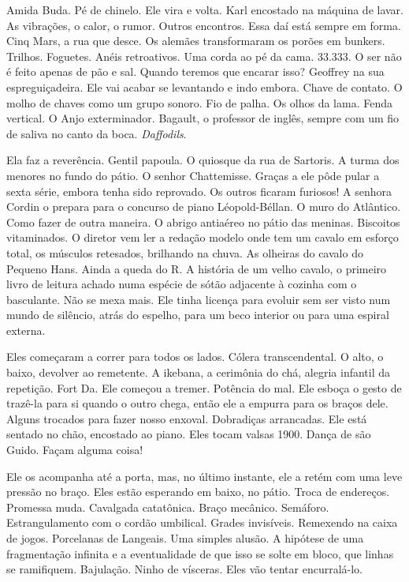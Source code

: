 Amida Buda. Pé de chinelo. Ele vira e volta. Karl encostado na máquina
de lavar. As vibrações, o calor, o rumor. Outros encontros. Essa daí
está sempre em forma. Cinq Mars, a rua que desce. Os alemães
transformaram os porões em bunkers. Trilhos. Foguetes. Anéis
retroativos. Uma corda ao pé da cama. 33.333. O ser não é feito apenas
de pão e sal. Quando teremos que encarar isso? Geoffrey na sua
espreguiçadeira. Ele vai acabar se levantando e indo embora. Chave de
contato. O molho de chaves como um grupo sonoro. Fio de palha. Os olhos
da lama. Fenda vertical. O Anjo exterminador. Bagault, o professor de
inglês, sempre com um fio de saliva no canto da boca. \emph{Daffodils}.

Ela faz a reverência. Gentil papoula. O quiosque da rua de Sartoris. A
turma dos menores no fundo do pátio. O senhor Chattemisse. Graças a ele
pôde pular a sexta série, embora tenha sido reprovado. Os outros ficaram
furiosos! A senhora Cordin o prepara para o concurso de piano
Léopold-Béllan. O muro do Atlântico. Como fazer de outra maneira. O
abrigo antiaéreo no pátio das meninas. Biscoitos vitaminados. O diretor
vem ler a redação modelo onde tem um cavalo em esforço total, os
músculos retesados, brilhando na chuva. As olheiras do cavalo do Pequeno
Hans. Ainda a queda do R. A história de um velho cavalo, o primeiro
livro de leitura achado numa espécie de sótão adjacente à cozinha com o
basculante. Não se mexa mais. Ele tinha licença para evoluir sem ser
visto num mundo de silêncio, atrás do espelho, para um beco interior ou
para uma espiral externa.

Eles começaram a correr para todos os lados. Cólera transcendental. O
alto, o baixo, devolver ao remetente. A ikebana, a cerimônia do chá,
alegria infantil da repetição. Fort Da. Ele começou a tremer. Potência
do mal. Ele esboça o gesto de trazê-la para si quando o outro chega,
então ele a empurra para os braços dele. Alguns trocados para fazer
nosso enxoval. Dobradiças arrancadas. Ele está sentado no chão,
encostado ao piano. Eles tocam valsas 1900. Dança de são Guido. Façam
alguma coisa!

Ele os acompanha até a porta, mas, no último instante, ele a retém com
uma leve pressão no braço. Eles estão esperando em baixo, no pátio.
Troca de endereços. Promessa muda. Cavalgada catatônica. Braço mecânico.
Semáforo. Estrangulamento com o cordão umbilical. Grades invisíveis.
Remexendo na caixa de jogos. Porcelanas de Langeais. Uma simples alusão.
A hipótese de uma fragmentação infinita e a eventualidade de que isso se
solte em bloco, que linhas se ramifiquem. Bajulação. Ninho de vísceras.
Eles vão tentar encurralá-lo.

